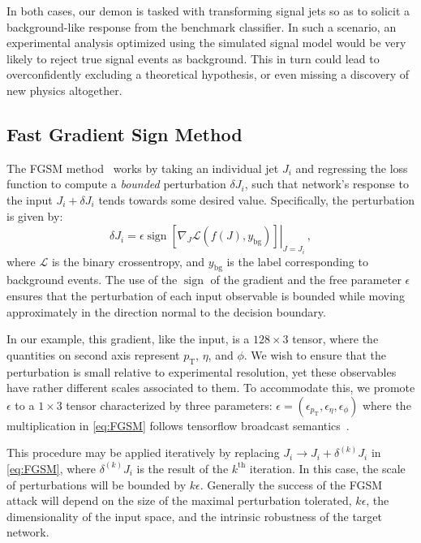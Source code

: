 \documentclass[reprint,nofootinbib,...]{revtex4-1}
\DeclareMathOperator{\sign}{sign}
\newcommand{\nconst}{128}       %
\newcommand{\pt}{p_\mathrm{T}} %
\begin{document}
In both cases, our demon is tasked with transforming signal jets so as to solicit a background-like response from the benchmark classifier.
In such a scenario, an experimental analysis optimized using the simulated signal model would be very likely to reject true signal events as background.
This in turn could lead to overconfidently excluding a theoretical hypothesis, or even missing a discovery of new physics altogether.

\subsection{Fast Gradient Sign Method}
\label{subsec:fgsm}
The FGSM method~\cite{DBLP:journals/corr/GoodfellowSS14} works by taking an individual jet $J_i$ and regressing the loss function to compute a \textit{bounded} perturbation $\delta J_i$, such that network's response to the input $J_i + \delta J_i$ tends towards some desired value.
Specifically, the perturbation is given by:
\begin{equation}
\label{eq:FGSM}
\delta J_i = \epsilon\left.\sign\left[\nabla_{J} \mathcal{L}\left(f(J), y_\mathrm{bg}\right)\right]\right\rvert_{J=J_i} \,,
\end{equation}
where $\mathcal{L}$ is the binary crossentropy, and $y_\mathrm{bg}$ is the label corresponding to background events.
The use of the $\sign$ of the gradient and the free parameter $\epsilon$ ensures that the perturbation of each input observable is bounded while moving approximately in the direction normal to the decision boundary.

In our example, this gradient, like the input, is a $\nconst\times3$ tensor, where the quantities on second axis represent $\pt$, $\eta$, and $\phi$.
We wish to ensure that the perturbation is small relative to experimental resolution, yet these observables have rather different scales associated to them.
To accommodate this, we promote $\epsilon$ to a $1\times3$ tensor characterized by three parameters: $\epsilon = (\epsilon_{\pt}, \epsilon_\eta, \epsilon_\phi)$ where the multiplication in \ref{eq:FGSM} follows tensorflow broadcast semantics~\cite{tensorflow}.

This procedure may be applied iteratively by replacing $J_i \rightarrow J_i + \delta^{(k)} J_i$ in \ref{eq:FGSM}, where $\delta^{(k)}J_i$ is the result of the $k^\mathrm{th}$ iteration.
In this case, the scale of perturbations will be bounded by $k\epsilon$.
Generally the success of the FGSM attack will depend on the size of the maximal perturbation tolerated, $k\epsilon$, the dimensionality of the input space, and the intrinsic robustness of the target network.
\end{document}
